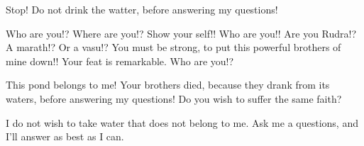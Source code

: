 Stop!
Do not drink the watter, before answering my questions!

Who are you!?
Where are you!?
Show your self!!
Who are you!!
Are you Rudra!?
A marath!?
Or a vasu!?
You must be strong, to put this powerful brothers of mine down!!
Your feat is remarkable.
Who are you!?

This pond belongs to me!
Your brothers died, because they drank from its waters, before answering my questions!
Do you wish to suffer the same faith?

I do not wish to take water that does not belong to me.
Ask me a questions, and I'll answer as best as I can.